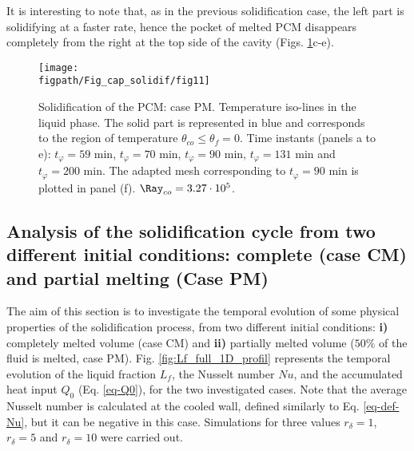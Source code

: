 \noindent It is interesting to  note that, as in the previous solidification case, the left part is solidifying at a faster rate, hence the pocket of melted PCM disappears completely from the right at the top side of the cavity (Figs. \ref{fig:evolution_t80}c-e).
\begin{figure}
	\begin{center}
		\texttt{[image: \\figpath/Fig\_cap\_solidif/fig11]}
	\end{center}
	\caption{Solidification of the PCM: case PM. Temperature iso-lines in the liquid phase. The solid part is represented in blue and corresponds to the region of temperature $\theta_{co} \leq \theta_f=0$. Time instants (panels  a to e): $t_{\varphi} = 59$ min, $t_{\varphi} = 70$ min, $t_{\varphi} = 90$ min, $t_{\varphi} = 131$ min and $t_{\varphi} = 200$ min. The adapted mesh corresponding to $t_{\varphi} = 90$ min is plotted in panel (f).  $ \Ray_{co}=3.27 \cdot 10^5$.}\label{fig:evolution_t80}
\end{figure}

\subsection{Analysis of the solidification cycle from two different initial conditions: complete (case CM) and partial melting (Case PM)}
 \label{sec_freezing_full} 

The aim of this section is to investigate the temporal evolution of some physical properties of the solidification process, from two different initial conditions: \textbf{i)} completely melted volume (case CM) and \textbf{ii)} partially melted volume ($50\%$ of the fluid is melted, case PM).  
 Fig. \ref{fig:Lf_full_1D_profil} represents the temporal  evolution of the liquid fraction $L_f$, the Nusselt number $N\!u$, and the accumulated heat input  $Q_0$ (Eq. \eqref{eq-Q0}), for the two investigated cases.
Note that the average Nusselt number is calculated at the cooled wall, defined similarly to Eq. \eqref{eq-def-Nu}, but it can be negative in this case. 
Simulations for three values $r_{\delta} = 1$,  $r_{\delta} = 5$ and  $r_{\delta} = 10$ were carried out.


